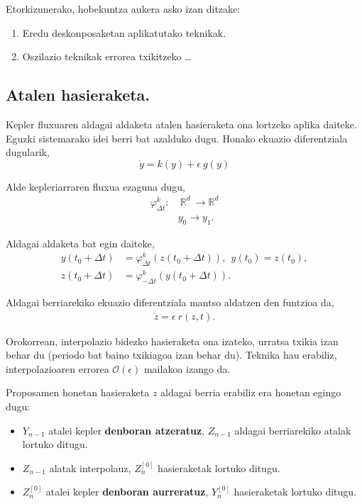 Etorkizunerako, hobekuntza aukera asko izan ditzake:
\begin{enumerate}
\item Eredu deskonposaketan aplikatutako teknikak.
\item Oszilazio teknikak errorea txikitzeko \dots
\end{enumerate}


\subsection*{Atalen hasieraketa.}
Kepler fluxuaren aldagai aldaketa atalen hasieraketa ona lortzeko aplika daiteke.
Eguzki sistemarako idei berri bat azalduko dugu. Honako ekuazio diferentziala dugularik,
\begin{equation*}
\dot{y}=k(y)+\epsilon \ g(y)
\end{equation*}

Alde kepleriarraren fluxua ezaguna dugu,
\begin{align*}
\varphi_{\Delta t}^k:&  \ \mathbb{R}^d \ \longrightarrow \mathbb{R}^d  \\
&  y_0 \longrightarrow y_1. 
\end{align*}

Aldagai aldaketa bat egin daiteke,
\begin{align*}
y(t_0+\Delta t) &= \varphi _{\Delta t}^k(z(t_0+\Delta t)), \ \ y(t_0)=z(t_0), \\
z(t_0+\Delta t) &= \varphi _{-\Delta t}^k(y(t_0+\Delta t)).
\end{align*}

Aldagai berriarekiko ekuazio diferentziala mantso aldatzen den funtzioa da,
\begin{align*}
\dot{z}=\epsilon \ r(z,t).
\end{align*} 


Orokorrean, interpolazio bidezko hasieraketa ona izateko,  urratsa txikia izan behar du (periodo bat baino txikiagoa izan behar du). Teknika hau erabiliz, interpolazioaren errorea $\mathcal{O}(\epsilon)$ mailakoa izango da.

Proposamen honetan hasieraketa $z$ aldagai berria erabiliz era honetan egingo dugu:
\begin{itemize}
\item $Y_{n-1}$ atalei kepler \textbf{denboran atzeratuz}, $Z_{n-1}$ aldagai berriarekiko atalak lortuko ditugu.
\item $Z_{n-1}$ alatak interpolauz, $Z_{n}^{[0]}$ hasieraketak lortuko ditugu.
\item $Z_{n}^{[0]}$ atalei kepler \textbf{denboran aurreratuz}, $Y_{n}^{[0]}$ hasieraketak lortuko ditugu.
\end{itemize}



